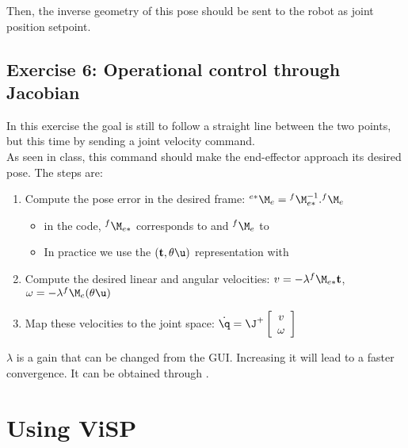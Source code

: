 \documentclass{ecnreport}
\begin{document}
  Then, the inverse geometry of this pose should be sent to the robot as joint position setpoint.
  
  \newpage
  \subsection*{Exercise 6: Operational control through Jacobian}
  
  In this exercise the goal is still to follow a straight line between the two points, but this time by sending a joint velocity command.\\
  
  As seen in class, this command should make the end-effector approach its desired pose. The steps are:
  \begin{enumerate}
    \item Compute the pose error in the desired frame: ${}^{e*}\M_e = {}^{f}\M_{e*}^{-1}.{}^{f}\M_e$
    \begin{itemize}
      \item in the code, ${}^{f}\M_{e*}$ corresponds to  and ${}^{f}\M_e$ to 
      \item In practice we use the $(\mathbf{t}, \theta\u)$ representation with 
    \end{itemize}
    \item Compute the desired linear and angular velocities: $v = -\lambda{}^{f}\M_{e*}\mathbf{t}$, \quad $\omega = -\lambda{}^{f}\M_{e} (\theta\u)$
    \item Map these velocities to the joint space: $\dot\q = \J^+ \left[\begin{array}{c}v\\\omega\end{array}\right]$
  \end{enumerate}
  $\lambda$ is a gain that can be changed from the GUI. Increasing it will lead to a faster convergence. It can be obtained through .
  
  
  
  \appendix
  
  
  \newpage
  
  \section{Using ViSP}\label{visp}
  
\end{document}

